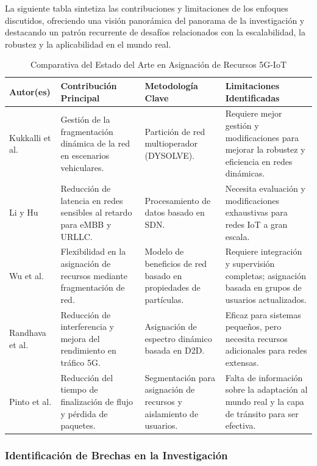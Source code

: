 \documentclass[12pt,a4paper]{article}
\begin{document}
La siguiente tabla sintetiza las contribuciones y limitaciones de los enfoques discutidos, ofreciendo una visión panorámica del panorama de la investigación y destacando un patrón recurrente de desafíos relacionados con la escalabilidad, la robustez y la aplicabilidad en el mundo real.

\begin{table}[H]
\centering
\small
\begin{tabular}{|p{2.5cm}|p{4cm}|p{3.5cm}|p{5cm}|}
\hline
\textbf{Autor(es)} & \textbf{Contribución Principal} & \textbf{Metodología Clave} & \textbf{Limitaciones Identificadas} \\
\hline
Kukkalli et al. & Gestión de la fragmentación dinámica de la red en escenarios vehiculares. & Partición de red multioperador (DYSOLVE). & Requiere mejor gestión y modificaciones para mejorar la robustez y eficiencia en redes dinámicas. \\
\hline
Li y Hu & Reducción de latencia en redes sensibles al retardo para eMBB y URLLC. & Procesamiento de datos basado en SDN. & Necesita evaluación y modificaciones exhaustivas para redes IoT a gran escala. \\
\hline
Wu et al. & Flexibilidad en la asignación de recursos mediante fragmentación de red. & Modelo de beneficios de red basado en propiedades de partículas. & Requiere integración y supervisión completas; asignación basada en grupos de usuarios actualizados. \\
\hline
Randhava et al. & Reducción de interferencia y mejora del rendimiento en tráfico 5G. & Asignación de espectro dinámico basada en D2D. & Eficaz para sistemas pequeños, pero necesita recursos adicionales para redes extensas. \\
\hline
Pinto et al. & Reducción del tiempo de finalización de flujo y pérdida de paquetes. & Segmentación para asignación de recursos y aislamiento de usuarios. & Falta de información sobre la adaptación al mundo real y la capa de tránsito para ser efectiva. \\
\hline
\end{tabular}
\caption{Comparativa del Estado del Arte en Asignación de Recursos 5G-IoT}
\label{tab:estado_arte}
\end{table}

\subsubsection{Identificación de Brechas en la Investigación}
\end{document}
